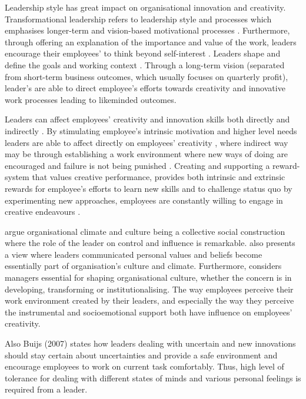 Leadership style has great impact on organisational innovation and creativity. Transformational leadership refers to leadership style and processes which emphasises longer-term and vision-based motivational processes \citep{bass1997full}. Furthermore, through offering an explanation of the importance and value of the work, leaders encourage their employees' to think beyond self-interest \citep{yukl2002leadership}. Leaders shape and define the goals and working context \citep{amabile1998kill, redmond1993putting}. Through a long-term vision (separated from short-term business outcomes, which usually focuses on quarterly profit), leader's are able to direct employee's efforts towards creativity and innovative work processes leading to likeminded outcomes\citep{amabile1996assessing}.

Leaders can affect employees' creativity and innovation skills both directly and indirectly \citep{jung2003role}. By stimulating employee's intrinsic motivation and higher level needs leaders are able to affect directly on employees' creativity \citep{tierney1999examination}, where indirect way may be through establishing a work environment where new ways of doing are encouraged and failure is not being punished \citep{amabile1996assessing}. Creating and supporting a reward-system that values creative performance, provides both intrinsic and extrinsic rewards for employee's efforts to learn new skills and to challenge status quo by experimenting new approaches, employees are constantly willing to engage in creative endeavours \citep{jung2001transformational,mumford1988creativity}.

\citep{mumford2002leading} argue organisational climate and culture being a collective social construction where the role of the leader on control and influence is remarkable. \citep{schein2010organizational} also presents a view where leaders communicated personal values and beliefs become essentially part of organisation's culture and climate. Furthermore,\citep{jung2001transformational} considers managers essential for shaping organisational culture, whether the concern is in developing, transforming or institutionalising. The way employees perceive their work environment created by their leaders, and especially the way they perceive the instrumental and socioemotional support both have influence on employees' creativity. \citep{oldham1996employee}

Also Buijs (2007) \citet{buijs2007innovation} states how leaders dealing with uncertain and new innovations should stay certain about uncertainties and provide a safe environment and encourage employees to work on current task comfortably. Thus, high level of tolerance for dealing with different states of minds and various personal feelings is required from a leader. \citep{buijs2007innovation}

